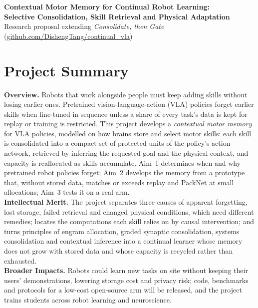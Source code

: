 \documentclass[11pt]{article}
\begin{document}
\begin{center}
{\Large\bfseries Contextual Motor Memory for Continual Robot Learning:\\[1pt]
Selective Consolidation, Skill Retrieval and Physical Adaptation}\\[3pt]
{\small Research proposal extending \emph{Consolidate, then Gate}
(\href{https://github.com/DishengTang/continual_vla}{github.com/DishengTang/continual\_vla})}
\end{center}
\vspace{-8pt}
\suppressfloats[t]

\section*{Project Summary}
\noindent\colorbox{summary}{\parbox{\dimexpr\linewidth-2\fboxsep\relax}{\small
\textbf{Overview.} Robots that work alongside people must keep adding skills without losing earlier ones. Pretrained
vision-language-action (VLA) policies forget earlier skills when fine-tuned in sequence unless a share of every task's
data is kept for replay or training is restricted. This project develops a \emph{contextual motor memory} for VLA policies, modelled on how brains store and
select motor skills: each skill is consolidated into a compact set of protected units of the policy's action network,
retrieved by inferring the requested goal and the physical context, and capacity is reallocated as skills accumulate.
Aim~1 determines when and why pretrained robot policies forget; Aim~2 develops the memory from a prototype that,
without stored data, matches or exceeds replay and PackNet at small allocations; Aim~3 tests it on a real arm.\\[2pt]
\textbf{Intellectual Merit.} The project separates three causes of apparent forgetting, lost storage, failed retrieval
and changed physical conditions, which need different remedies; locates the computations each skill relies on by causal
intervention; and turns principles of engram allocation, graded synaptic consolidation, systems consolidation and
contextual inference into a continual learner whose memory does not grow with stored data and whose capacity is
recycled rather than exhausted.\\[2pt]
\textbf{Broader Impacts.} Robots could learn new tasks on site without keeping their users' demonstrations, lowering
storage cost and privacy risk; code, benchmarks and protocols for a low-cost open-source arm will be released, and the
project trains students across robot learning and neuroscience.}}
\end{document}
